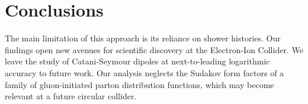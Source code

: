 \section{Conclusions}\label{sec:conclusions}

The main limitation of this approach is its reliance on shower
histories. Our findings open new avenues for scientific discovery at the
Electron-Ion Collider. We leave the study of Catani-Seymour dipoles at
next-to-leading logarithmic accuracy to future work. Our analysis
neglects the Sudakov form factors of a family of gluon-initiated parton
distribution functions, which may become relevant at a future circular
collider.


